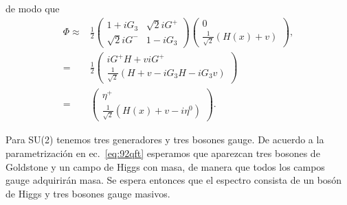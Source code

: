 de modo que
\begin{align}
 {\Phi}\approx&
  \frac{1}{2}\begin{pmatrix}
    1+i G_3&\sqrt{2}i G^+\\
    \sqrt{2}i G^-&1-i G_3
  \end{pmatrix}  \begin{pmatrix}
    0\\
    \frac{1}{\sqrt{2}}(H(x)+v)
  \end{pmatrix}, \nonumber\\
  =&\frac{1}{2}\begin{pmatrix}
    i G^+H+vi G^+\\
    \frac{1}{\sqrt{2}}(H+v-i G_3H-i G_3 v)
  \end{pmatrix}\nonumber\\
  =&\begin{pmatrix}
    \eta^+\\
    \frac{1}{\sqrt{2}}(H(x)+v-i\eta^0)
  \end{pmatrix}.\nonumber
\end{align}
\begin{frame}
Para SU(2) tenemos tres generadores y tres bosones gauge. De acuerdo a la parametrización en ec.~\eqref{eq:92qft} esperamos que aparezcan tres bosones de Goldstone y un campo de Higgs con masa, de manera que todos los campos gauge adquirirán masa.
Se espera entonces que el espectro consista de un bosón de Higgs y tres bosones gauge masivos.
\end{frame}

